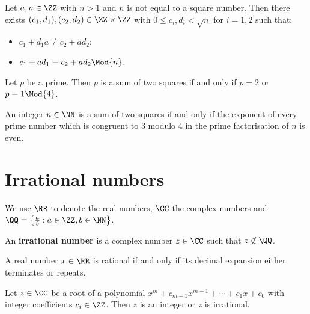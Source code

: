 \documentclass[12pt, a4paper]{article}
\begin{document}
\begin{lemma}
    Let \(a,n \in \ZZ\) with \(n>1\) and \(n\) is not equal to a square number. Then there exists \((c_1,d_1), (c_2,d_2)\in \ZZ \times \ZZ\) with \(0 \leq c_i,d_i < \sqrt{n}\) for \(i=1,2\) such that:
    \begin{itemize}
        \item \(c_1+d_1a \neq c_2+ad_2\);
        \item \(c_1+ad_1 \equiv c_2+ad_2  \Mod{n}\).
    \end{itemize}
\end{lemma}

\begin{mdthm}
    Let \(p\) be a prime. Then \(p\) is a sum of two squares if and only if \(p=2\) or \(p\equiv 1 \Mod{4}\).
\end{mdthm}

\begin{mdthm}
    An integer \(n \in \NN\) is a sum of two squares if and only if the exponent of every prime number which is congruent to \(3\) modulo \(4\) in the prime factorisation of \(n\) is even.
\end{mdthm}

\section{Irrational numbers}

\begin{definition}
    We use \(\RR\) to denote the real numbers, \(\CC\) the complex numbers and \(\QQ =\left\{\frac{a}{b} : a \in \ZZ, b\in \NN\right\}\).
\end{definition}

\begin{definition}
    An \textbf{irrational number} is a complex number \(z \in \CC\) such that \(z \not\in \QQ\).
\end{definition}

\begin{theorem}
    A real number \(x \in \RR\) is rational if and only if its decimal expansion either terminates or repeats.
\end{theorem}

\begin{mdprop}
    Let \(z \in \CC\) be a root of a polynomial \(x^m +c_{m-1}x^{m-1}+\cdots + c_1x+c_0\) with integer coefficients \(c_i \in \ZZ\). Then \(z\) is an integer or \(z\) is irrational.
\end{mdprop}
\end{document}
